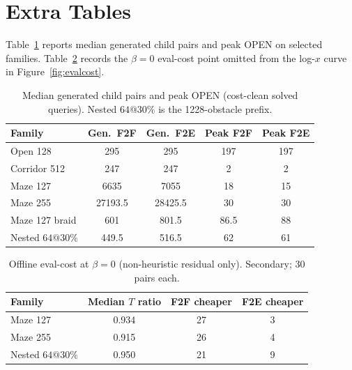 \section{Extra Tables}

Table~\ref{tab:generated} reports median generated child pairs and peak OPEN on selected families. Table~\ref{tab:evalcost-beta0} records the \(\beta=0\) eval-cost point omitted from the log-\(x\) curve in Figure~\ref{fig:evalcost}.

\begin{table}[tb]
\centering
\small
\setlength{\tabcolsep}{4pt}
\caption{Median generated child pairs and peak OPEN (cost-clean solved queries). Nested \(64@30\%\) is the 1228-obstacle prefix.}
\label{tab:generated}
\begin{tabular}{@{}lcccc@{}}
\toprule
Family & Gen.\ F2F & Gen.\ F2E & Peak F2F & Peak F2E \\
\midrule
Open 128 & 295 & 295 & 197 & 197 \\
Corridor 512 & 247 & 247 & 2 & 2 \\
Maze 127 & 6635 & 7055 & 18 & 15 \\
Maze 255 & 27193.5 & 28425.5 & 30 & 30 \\
Maze 127 braid & 601 & 801.5 & 86.5 & 88 \\
Nested \(64@30\%\) & 449.5 & 516.5 & 62 & 61 \\
\bottomrule
\end{tabular}
\end{table}

\begin{table}[tb]
\centering
\small
\setlength{\tabcolsep}{4pt}
\caption{Offline eval-cost at \(\beta=0\) (non-heuristic residual only). Secondary; 30 pairs each.}
\label{tab:evalcost-beta0}
\begin{tabular}{@{}lccc@{}}
\toprule
Family & Median \(T\) ratio & F2F cheaper & F2E cheaper \\
\midrule
Maze 127 & 0.934 & 27 & 3 \\
Maze 255 & 0.915 & 26 & 4 \\
Nested \(64@30\%\) & 0.950 & 21 & 9 \\
\bottomrule
\end{tabular}
\end{table}
